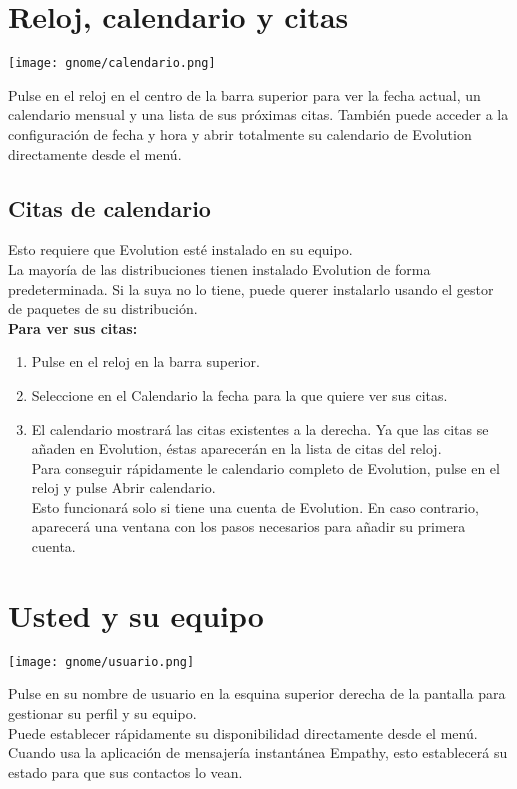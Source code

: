 \section{Reloj, calendario y citas}
\begin{center}
\texttt{[image: gnome/calendario.png]} 
\end{center}
Pulse en el reloj en el centro de la barra superior para ver la fecha actual, un calendario mensual y una lista de sus próximas citas. También puede acceder a la configuración de fecha y hora y abrir totalmente su calendario de Evolution directamente desde el menú.
\subsection{Citas de calendario}
Esto requiere que Evolution esté instalado en su equipo.\\
La mayoría de las distribuciones tienen instalado Evolution de forma predeterminada. Si la suya no lo tiene, puede querer instalarlo usando el gestor de paquetes de su distribución.\\

{\bf Para ver sus citas:}
\begin{enumerate}
\item Pulse en el reloj en la barra superior.
\item Seleccione en el Calendario la fecha para la que quiere ver sus citas.
\item El calendario mostrará las citas existentes a la derecha. Ya que las citas se añaden en Evolution, éstas aparecerán en la lista de citas del reloj.\\

Para conseguir rápidamente le calendario completo de Evolution, pulse en el reloj y pulse Abrir calendario.\\
Esto funcionará solo si tiene una cuenta de Evolution. En caso contrario, aparecerá una ventana con los pasos necesarios para añadir su primera cuenta.
\end{enumerate}
\section{Usted y su equipo}
\begin{center}
\texttt{[image: gnome/usuario.png]} 
\end{center}
Pulse en su nombre de usuario en la esquina superior derecha de la pantalla para gestionar su perfil y su equipo.\\
Puede establecer rápidamente su disponibilidad directamente desde el menú. Cuando usa la aplicación de mensajería instantánea Empathy, esto establecerá su estado para que sus contactos lo vean.\\

